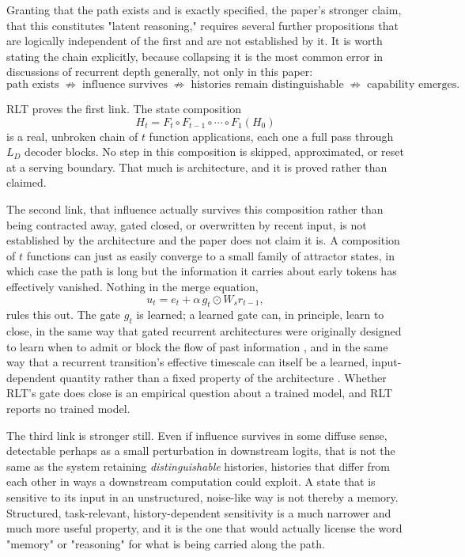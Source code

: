 \documentclass[11pt]{article}
\begin{document}
Granting that the path exists and is exactly specified, the paper's stronger claim, that this constitutes "latent reasoning," requires several further propositions that are logically independent of the first and are not established by it. It is worth stating the chain explicitly, because collapsing it is the most common error in discussions of recurrent depth generally, not only in this paper:
\[
\text{path exists}
\;\not\Rightarrow\;
\text{influence survives}
\;\not\Rightarrow\;
\text{histories remain distinguishable}
\;\not\Rightarrow\;
\text{capability emerges.}
\]

RLT proves the first link. The state composition
\[
H_t = F_t \circ F_{t-1} \circ \cdots \circ F_1(H_0)
\]
is a real, unbroken chain of $t$ function applications, each one a full pass through $L_D$ decoder blocks. No step in this composition is skipped, approximated, or reset at a serving boundary. That much is architecture, and it is proved rather than claimed.

The second link, that influence actually survives this composition rather than being contracted away, gated closed, or overwritten by recent input, is not established by the architecture and the paper does not claim it is. A composition of $t$ functions can just as easily converge to a small family of attractor states, in which case the path is long but the information it carries about early tokens has effectively vanished. Nothing in the merge equation,
\[
u_t = e_t + \alpha\, g_t \odot W_s r_{t-1},
\]
rules this out. The gate $g_t$ is learned; a learned gate can, in principle, learn to close, in the same way that gated recurrent architectures were originally designed to learn when to admit or block the flow of past information \cite{hochreiter1997lstm}, and in the same way that a recurrent transition's effective timescale can itself be a learned, input-dependent quantity rather than a fixed property of the architecture \cite{tallec2018warptime}. Whether RLT's gate does close is an empirical question about a trained model, and RLT reports no trained model.

The third link is stronger still. Even if influence survives in some diffuse sense, detectable perhaps as a small perturbation in downstream logits, that is not the same as the system retaining \emph{distinguishable} histories, histories that differ from each other in ways a downstream computation could exploit. A state that is sensitive to its input in an unstructured, noise-like way is not thereby a memory. Structured, task-relevant, history-dependent sensitivity is a much narrower and much more useful property, and it is the one that would actually license the word "memory" or "reasoning" for what is being carried along the path.
\end{document}
